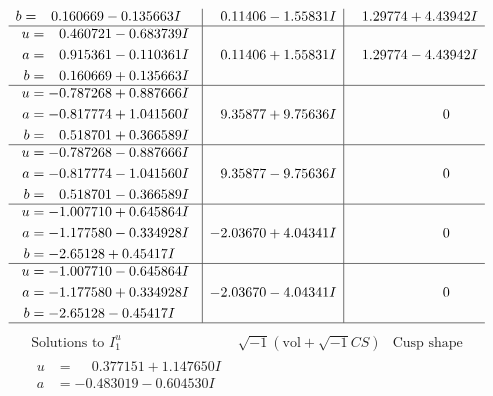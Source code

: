 \documentclass[1p]{elsarticle_modified}
\theoremstyle{definition}
\newcommand{\I}{\sqrt{-1}}
\begin{document}
$$\begin{array}{c|c|c}
\begin{aligned}
b &= \phantom{-}0.160669 - 0.135663 I\end{aligned}
 & \phantom{-}0.11406 - 1.55831 I & \phantom{-}1.29774 + 4.43942 I \\ \hline\begin{aligned}
u &= \phantom{-}0.460721 - 0.683739 I \\
a &= \phantom{-}0.915361 - 0.110361 I \\
b &= \phantom{-}0.160669 + 0.135663 I\end{aligned}
 & \phantom{-}0.11406 + 1.55831 I & \phantom{-}1.29774 - 4.43942 I \\ \hline\begin{aligned}
u &= -0.787268 + 0.887666 I \\
a &= -0.817774 + 1.041560 I \\
b &= \phantom{-}0.518701 + 0.366589 I\end{aligned}
 & \phantom{-}9.35877 + 9.75636 I & \phantom{-0.000000 } 0 \\ \hline\begin{aligned}
u &= -0.787268 - 0.887666 I \\
a &= -0.817774 - 1.041560 I \\
b &= \phantom{-}0.518701 - 0.366589 I\end{aligned}
 & \phantom{-}9.35877 - 9.75636 I & \phantom{-0.000000 } 0 \\ \hline\begin{aligned}
u &= -1.007710 + 0.645864 I \\
a &= -1.177580 - 0.334928 I \\
b &= -2.65128 + 0.45417 I\end{aligned}
 & -2.03670 + 4.04341 I & \phantom{-0.000000 } 0 \\ \hline\begin{aligned}
u &= -1.007710 - 0.645864 I \\
a &= -1.177580 + 0.334928 I \\
b &= -2.65128 - 0.45417 I\end{aligned}
 & -2.03670 - 4.04341 I & \phantom{-0.000000 } 0\\
 \hline 
 \end{array}$$\newpage$$\begin{array}{c|c|c}  
\text{Solutions to }I^u_{1}& \I (\text{vol} + \sqrt{-1}CS) & \text{Cusp shape}\\
 \hline 
\begin{aligned}
u &= \phantom{-}0.377151 + 1.147650 I \\
a &= -0.483019 - 0.604530 I \\

\end{aligned}
\end{array}$$
\end{document}
